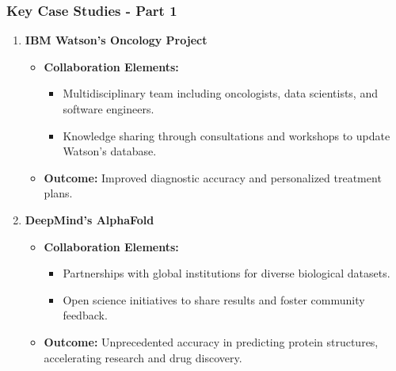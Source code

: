 \documentclass[aspectratio=169]{beamer}
\begin{document}
\begin{frame}[fragile]
    \frametitle{Key Case Studies - Part 1}
    \begin{enumerate}
        \item \textbf{IBM Watson's Oncology Project}
            \begin{itemize}
                \item \textbf{Collaboration Elements:}
                    \begin{itemize}
                        \item Multidisciplinary team including oncologists, data scientists, and software engineers.
                        \item Knowledge sharing through consultations and workshops to update Watson's database.
                    \end{itemize}
                \item \textbf{Outcome:} Improved diagnostic accuracy and personalized treatment plans.
            \end{itemize}
        
        \item \textbf{DeepMind's AlphaFold}
            \begin{itemize}
                \item \textbf{Collaboration Elements:}
                    \begin{itemize}
                        \item Partnerships with global institutions for diverse biological datasets.
                        \item Open science initiatives to share results and foster community feedback.
                    \end{itemize}
                \item \textbf{Outcome:} Unprecedented accuracy in predicting protein structures, accelerating research and drug discovery.
            \end{itemize}
    \end{enumerate}
\end{frame}
\end{document}

